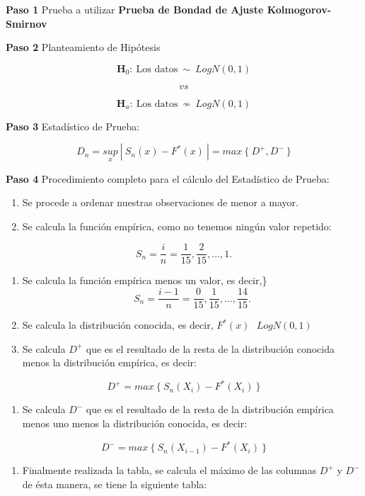 \documentclass[
  a4paper,
  oneside,
  openany]{book}
\providecommand{\tightlist}{%
  \setlength{\itemsep}{0pt}\setlength{\parskip}{0pt}}
\begin{document}
\textbf{Paso 1} Prueba a utilizar \textbf{Prueba de Bondad de Ajuste Kolmogorov-Smirnov}

\textbf{Paso 2} Planteamiento de Hipótesis

\[\textbf{H}_0: \ \mbox{Los datos} \ \sim  \ LogN(0,1)\]

\[vs\]

\[\textbf{H}_a: \ \mbox{Los datos} \  \nsim \  LogN(0,1)\]

\textbf{Paso 3} Estadístico de Prueba:

\[D_{n}=\underset{x}{sup} \ | \ S_{n}(x)-F^*(x) \ |=max \ \{\ D^+,D^- \ \}\]

\textbf{Paso 4} Procedimiento completo para el cálculo del Estadístico de Prueba:

\begin{enumerate}
\def\labelenumi{\arabic{enumi})}
\item
  Se procede a ordenar nuestras observaciones de menor a mayor.
\item
  Se calcula la función empírica, como no tenemos ningún valor repetido:
\end{enumerate}

\[S_{n}= \frac{i}{n}=\frac{1}{15},\frac{2}{15}, \ldots, 1.\]

\begin{enumerate}
\def\labelenumi{\arabic{enumi})}
\setcounter{enumi}{2}
\item
  Se calcula la función empírica menos un valor, es decir,\}
  \[S_{n}= \frac{i-1}{n}=\frac{0}{15},\frac{1}{15}, \ldots, \frac{14}{15}.\]
\item
  Se calcula la distribución conocida, es decir, \(F^*(x) \ \ \  LogN(0,1)\)
\item
  Se calcula \(D^+\) que es el resultado de la resta de la distribución conocida menos la distribución empírica, es decir:
\end{enumerate}

\[D^+= max \ \{\ S_{n}(X_{i})-F^*(X_{i}) \ \}\]

\begin{enumerate}
\def\labelenumi{\arabic{enumi})}
\setcounter{enumi}{5}
\tightlist
\item
  Se calcula \(D^-\) que es el resultado de la resta de la distribución empírica menos uno menos la distribución conocida, es decir:
\end{enumerate}

\[D^-= max \ \{\ S_{n}(X_{i-1})-F^*(X_{i}) \ \}\]

\begin{enumerate}
\def\labelenumi{\arabic{enumi})}
\setcounter{enumi}{6}
\tightlist
\item
  Finalmente realizada la tabla, se calcula el máximo de las columnas \(D^+\) y \(D^-\) de ésta manera, se tiene la siguiente tabla:
\end{enumerate}
\end{document}
